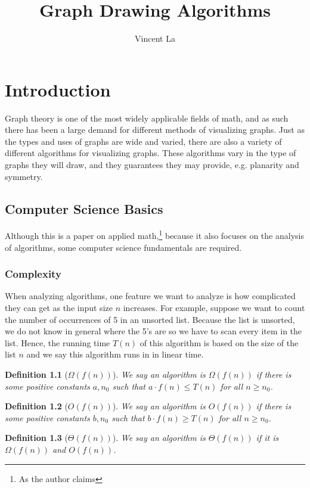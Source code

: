 \documentclass[11pt]{report}
\title{Graph Drawing Algorithms}
\author{Vincent La}
\newtheorem{defn}{Definition}[section]
\begin{document}
    
\maketitle
\tableofcontents

\chapter{Introduction}
Graph theory is one of the most widely applicable fields of math, and as such there has been a large demand for different methods of visualizing graphs. Just as the types and uses of graphs are wide and varied, there are also a variety of different algorithms for visualizing graphs. These algorithms vary in the type of graphs they will draw, and they guarantees they may provide, e.g. planarity and symmetry.

\section{Computer Science Basics}
Although this is a paper on applied math,\footnote{As the author claims} because it also focuses on the analysis of algorithms, some computer science fundamentals are required.

\subsection{Complexity}
When analyzing algorithms, one feature we want to analyze is how complicated they can get as the input size $n$ increases. For example, suppose we want to count the number of occurrences of 5 in an unsorted list. Because the list is unsorted, we do not know in general where the 5's are so we have to scan every item in the list. Hence, the running time $T(n)$ of this algorithm is based on the size of the list $n$ and we say this algorithm runs in in linear time.

\begin{defn}[$\Omega(f(n))$] We say an algorithm is $\Omega(f(n))$ if there is some positive constants $a, n_0$ such that $a \cdot f(n) \leq T(n)$ for all $n \geq n_0$.
\end{defn}

\begin{defn}[$O(f(n))$] We say an algorithm is $O(f(n))$ if there is some positive constants $b, n_0$ such that $b \cdot f(n) \geq T(n)$ for all $n \geq n_0$.
\end{defn}

\begin{defn}[$\Theta(f(n))$] We say an algorithm is $\Theta(f(n))$ if it is $\Omega(f(n))$ and $O(f(n))$.
\end{defn}
\end{document}
